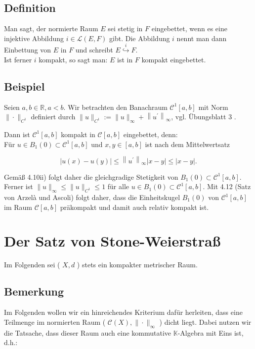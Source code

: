 \documentclass[10pt, letterpaper]{article}
\begin{document}
\subsection*{Definition}
Man sagt, der normierte Raum $E$ sei stetig in $F$ eingebettet, wenn es eine injektive Abbildung $i \in \mathcal{L}(E, F)$ gibt. Die Abbildung $i$ nennt man dann Einbettung von $E$ in $F$ und schreibt $E \stackrel{i}{\hookrightarrow} F$.\\
Ist ferner $i$ kompakt, so sagt man: $E$ ist in $F$ kompakt eingebettet.

\subsection*{Beispiel}
Seien $a, b \in \mathbb{R}, a<b$. Wir betrachten den Banachraum $\mathcal{C}^{1}[a, b]$ mit Norm $\|\cdot\|_{C^{1}}$ definiert durch $\|u\|_{C^{1}}:=\|u\|_{\infty}+\left\|u^{\prime}\right\|_{\infty}$, vgl. Übungsblatt 3 .

Dann ist $\mathcal{C}^{1}[a, b]$ kompakt in $\mathcal{C}[a, b]$ eingebettet, denn:\\
Für $u \in B_{1}(0) \subset \mathcal{C}^{1}[a, b]$ und $x, y \in[a, b]$ ist nach dem Mittelwertsatz

$$
|u(x)-u(y)| \leq\left\|u^{\prime}\right\|_{\infty}|x-y| \leq|x-y| .
$$

Gemäß 4.10ii) folgt daher die gleichgradige Stetigkeit von $B_{1}(0) \subset \mathcal{C}^{1}[a, b]$. Ferner ist $\|u\|_{\infty} \leq\|u\|_{C^{1}} \leq 1$ für alle $u \in B_{1}(0) \subset \mathcal{C}^{1}[a, b]$. Mit 4.12 (Satz von Arzelà und Ascoli) folgt daher, dass die Einheitskugel $B_{1}(0)$ von $\mathcal{C}^{1}[a, b]$ im Raum $\mathcal{C}[a, b]$ präkompakt und damit auch relativ kompakt ist.

\section*{Der Satz von Stone-Weierstraß}
Im Folgenden sei ( $X, d$ ) stets ein kompakter metrischer Raum.

\subsection*{Bemerkung}
Im Folgenden wollen wir ein hinreichendes Kriterium dafür herleiten, dass eine Teilmenge im normierten Raum ( $\mathcal{C}(X),\|\cdot\|_{\infty}$ ) dicht liegt. Dabei nutzen wir die Tatsache, dass dieser Raum auch eine kommutative $\mathbb{K}$-Algebra mit Eins ist, d.h.:
\end{document}

